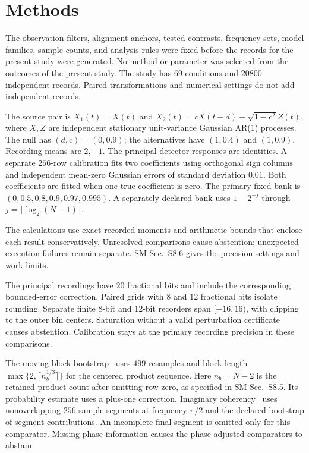 \section{Methods}\label{sec:study-methods}
The observation filters, alignment anchors, tested contrasts, frequency sets, model families, sample counts, and analysis rules were fixed before the records for the present study were generated. No method or parameter was selected from the outcomes of the present study. The study has $69$ conditions and $20800$ independent records. Paired transformations and numerical settings do not add independent records.

The source pair is $X_1(t)=X(t)$ and $X_2(t)=cX(t-d)+\sqrt{1-c^2}Z(t)$, where $X,Z$ are independent stationary unit-variance Gaussian AR(1) processes. The null has $(d,c)=(0,0.9)$; the alternatives have $(1,0.4)$ and $(1,0.9)$. Recording means are $2,-1$. The principal detector responses are identities. A separate $256$-row calibration fits two coefficients using orthogonal sign columns and independent mean-zero Gaussian errors of standard deviation $0.01$. Both coefficients are fitted when one true coefficient is zero. The primary fixed bank is $(0,0.5,0.8,0.9,0.97,0.995)$. A separately declared bank uses $1-2^{-j}$ through $j=\lceil\log_2(N-1)\rceil$.

The calculations use exact recorded moments and arithmetic bounds that enclose each result conservatively. Unresolved comparisons cause abstention; unexpected execution failures remain separate. SM Sec.~S8.6 gives the precision settings and work limits.

The principal recordings have $20$ fractional bits and include the corresponding bounded-error correction. Paired grids with $8$ and $12$ fractional bits isolate rounding. Separate finite $8$-bit and $12$-bit recorders span $[-16,16)$, with clipping to the outer bin centers. Saturation without a valid perturbation certificate causes abstention. Calibration stays at the primary recording precision in these comparisons.

The moving-block bootstrap~\cite{kunsch1989} uses $499$ resamples and block length $\max\{2,\lceil n_b^{1/3}\rceil\}$ for the centered product sequence. Here $n_b=N-2$ is the retained product count after omitting row zero, as specified in SM Sec.~S8.5. Its probability estimate uses a plus-one correction. Imaginary coherency~\cite{noltecoherency2004} uses nonoverlapping $256$-sample segments at frequency $\pi/2$ and the declared bootstrap of segment contributions. An incomplete final segment is omitted only for this comparator. Missing phase information causes the phase-adjusted comparators to abstain.

